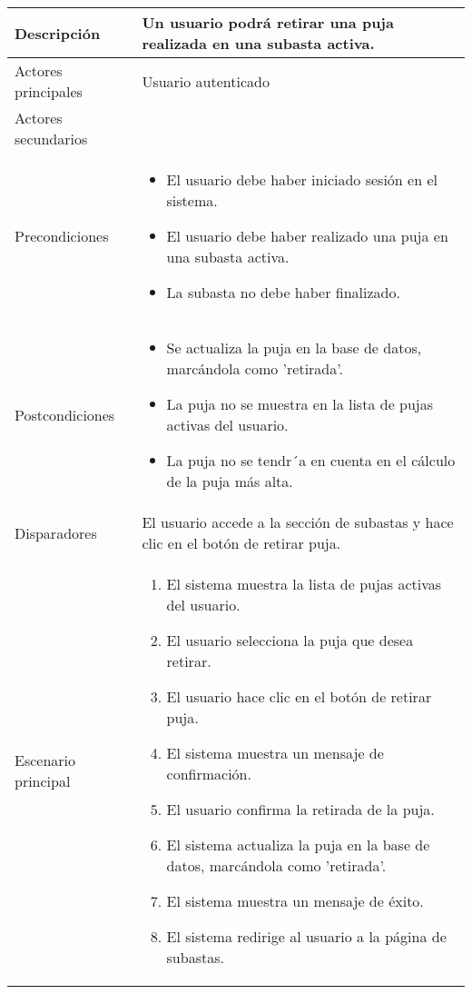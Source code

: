 \begin{longtable}{
    >{\columncolor{lightgreen!20}}p{4cm}
    p{12cm}
    }
    \midrule
    Descripción & Un usuario podrá retirar una puja realizada en una subasta activa. \\
    \midrule
    Actores principales & Usuario autenticado \\
    \midrule
    Actores secundarios &  \\
    \midrule
    Precondiciones & \begin{itemize}[nosep,leftmargin=*]
        \item El usuario debe haber iniciado sesión en el sistema.
        \item El usuario debe haber realizado una puja en una subasta activa.
        \item La subasta no debe haber finalizado.
    \end{itemize} \\
    \midrule
    Postcondiciones & \begin{itemize}[nosep,leftmargin=*]
        \item Se actualiza la puja en la base de datos, marcándola como 'retirada'.
        \item La puja no se muestra en la lista de pujas activas del usuario.
        \item La puja no se tendr´a en cuenta en el cálculo de la puja más alta.
    \end{itemize} \\
    \midrule
    Disparadores & El usuario accede a la sección de subastas y hace clic en el botón de retirar puja. \\
    \midrule
    Escenario principal & \begin{enumerate}[nosep,leftmargin=*]
        \item El sistema muestra la lista de pujas activas del usuario.
        \item El usuario selecciona la puja que desea retirar.
        \item El usuario hace clic en el botón de retirar puja.
        \item El sistema muestra un mensaje de confirmación.
        \item El usuario confirma la retirada de la puja.
        \item El sistema actualiza la puja en la base de datos, marcándola como 'retirada'.
        \item El sistema muestra un mensaje de éxito.
        \item El sistema redirige al usuario a la página de subastas.
    \end{enumerate} \\

\end{longtable}

